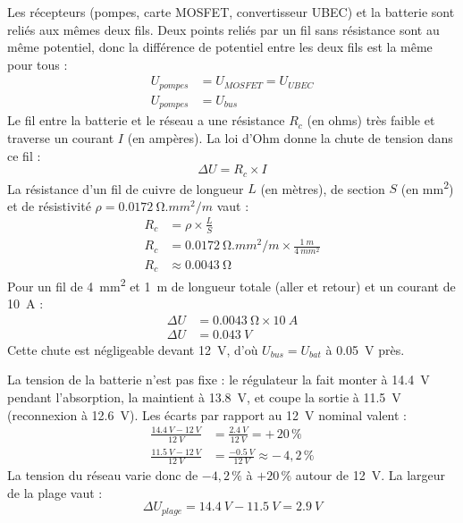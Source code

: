 \begin{demonstration}
Les récepteurs (pompes, carte MOSFET, convertisseur UBEC) et la batterie sont reliés aux mêmes deux fils. Deux points reliés par un fil sans résistance sont au même potentiel, donc la différence de potentiel entre les deux fils est la même pour tous :
\begin{align*}
U_{pompes} &= U_{MOSFET} = U_{UBEC}\\
U_{pompes} &= U_{bus}
\end{align*}
Le fil entre la batterie et le réseau a une résistance $R_c$ (en ohms) très faible et traverse un courant $I$ (en ampères). La loi d'Ohm donne la chute de tension dans ce fil :
\[
\Delta U = R_c \times I
\]
La résistance d'un fil de cuivre de longueur $L$ (en mètres), de section $S$ (en \unit{mm^2}) et de résistivité $\rho = \qty{0,0172}{\ohm.mm^2/m}$ vaut :
\begin{align*}
R_c &= \rho \times \frac{L}{S}\\
R_c &= \qty{0,0172}{\ohm.mm^2/m} \times \frac{\qty{1}{m}}{\qty{4}{mm^2}}\\
R_c &\approx \qty{0,0043}{\ohm}
\end{align*}
Pour un fil de \qty{4}{mm^2} et \qty{1}{m} de longueur totale (aller et retour) et un courant de \qty{10}{A} :
\begin{align*}
\Delta U &= \qty{0,0043}{\ohm} \times \qty{10}{A}\\
\Delta U &= \qty{0,043}{V}
\end{align*}
Cette chute est négligeable devant \qty{12}{V}, d'où $U_{bus} = U_{bat}$ à \qty{0,05}{V} près.

La tension de la batterie n'est pas fixe : le régulateur la fait monter à \qty{14,4}{V} pendant l'absorption, la maintient à \qty{13,8}{V}, et coupe la sortie à \qty{11,5}{V} (reconnexion à \qty{12,6}{V}). Les écarts par rapport au \qty{12}{V} nominal valent :
\begin{align*}
\frac{\qty{14,4}{V} - \qty{12}{V}}{\qty{12}{V}} &= \frac{\qty{2,4}{V}}{\qty{12}{V}} = +\,20\,\%\\
\frac{\qty{11,5}{V} - \qty{12}{V}}{\qty{12}{V}} &= \frac{-\qty{0,5}{V}}{\qty{12}{V}} \approx -\,4,2\,\%
\end{align*}
La tension du réseau varie donc de $-4,2\,\%$ à $+20\,\%$ autour de \qty{12}{V}. La largeur de la plage vaut :
\[
\Delta U_{plage} = \qty{14,4}{V} - \qty{11,5}{V} = \qty{2,9}{V}
\]
\end{demonstration}

